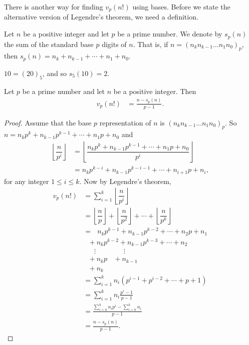 \documentclass[12pt]{subfile}
\begin{document}
There is another way for finding $v_p(n!)$ using bases. Before we state the alternative version of Legendre's theorem, we need a definition.

\begin{definition}
	Let $n$ be a positive integer and let $p$ be a prime number.  We denote by $s_p(n)$  the sum of the standard base $p$ digits of $n$. That is, if $n=(n_k n_{k-1}\ldots n_1 n_0)_p$, then $s_p(n)=n_k+ n_{k-1}+\cdots +n_1+ n_0$.
\end{definition}

\begin{example}
	$10=(20)_5$, and so $s_5(10)=2$.
\end{example}


\begin{theorem}\label{thm:legendrealternative}
	Let $p$ be a prime number and let $n$ be a positive integer. Then
	\begin{align*}
	v_p(n!) & =\frac{n-s_p(n)}{p-1}.
	\end{align*}
\end{theorem}

\begin{proof}
	Assume that the base $p$ representation of $n$ is $(n_k n_{k-1}\ldots n_1 n_0)_p$. So $n=n_kp^k + n_{k-1}p^{k-1} + \cdots + n_1 p +n_0$ and
	\begin{align*}
	\left\lfloor\dfrac{n}{p^i}\right\rfloor &=	\left\lfloor\dfrac{n_kp^k + n_{k-1}p^{k-1} + \cdots + n_1 p +n_0}{p^i}\right\rfloor \\
	&= n_kp^{k-i} + n_{k-1}p^{k-i-1} + \cdots + n_{i+1} p + n_i,
	\end{align*}
	for any integer $1 \leq i \leq k$. Now by Legendre's theorem,
	\begin{align*}
	v_p(n!) & = \sum_{i=1}^{k}\left\lfloor\dfrac{n}{p^i}\right\rfloor\\
	&= \left\lfloor\dfrac{n}{p}\right\rfloor+\left\lfloor\dfrac{n}{p^2}\right\rfloor+\cdots+\left\lfloor\dfrac{n}{p^k}\right\rfloor\\
	&= \ \ \ n_kp^{k-1} + n_{k-1}p^{k-2} + \cdots + n_{2} p + n_1 \\  &\ \ \ + n_kp^{k-2} + n_{k-1}p^{k-3} + \cdots + n_{2}\\ &\ \ \ \ \ \ \ \vdots \qquad\qquad \vdots\\  &\ \ \ + n_kp  \ \ \ \ + n_{k-1} \\&\ \ \ + n_k\\
	&=\sum_{i=1}^k n_i(p^{i-1}+p^{i-2}+\cdots+p+1)\\
	&= \sum_{i=1}^k n_i\frac{p^i-1}{p-1}\\
	&=\displaystyle \frac{\displaystyle \sum\limits_{i=0}^k n_i p^i - \sum\limits_{i=0}^k n_i}{p-1}\\
	&=\frac{n-s_p(n)}{p-1}.
	\end{align*}
\end{proof}
\end{document}
